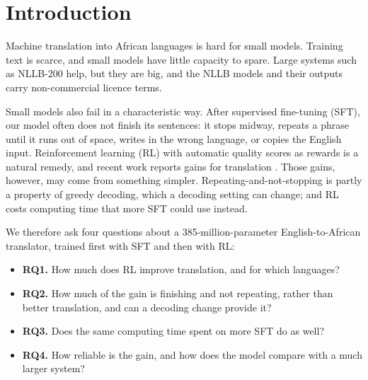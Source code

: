 \section{Introduction}\label{sec:intro}
Machine translation into African languages is hard for small models. Training text is scarce, and small models have little capacity to spare. Large systems such as NLLB-200 \citep{nllb2022nllb} help, but they are big, and the NLLB models and their outputs carry non-commercial licence terms.

Small models also fail in a characteristic way. After supervised fine-tuning (SFT), our model often does not finish its sentences: it stops midway, repeats a phrase until it runs out of space, writes in the wrong language, or copies the English input. Reinforcement learning (RL) with automatic quality scores as rewards is a natural remedy, and recent work reports gains for translation \citep{shao2024deepseekmath,feng2025mtr1zero,finkelstein2026translategemma}. Those gains, however, may come from something simpler. Repeating-and-not-stopping is partly a property of greedy decoding, which a decoding setting can change; and RL costs computing time that more SFT could use instead.

We therefore ask four questions about a 385-million-parameter English-to-African translator, trained first with SFT and then with RL:
\begin{itemize}
\item \textbf{RQ1.} How much does RL improve translation, and for which languages?
\item \textbf{RQ2.} How much of the gain is finishing and not repeating, rather than better translation, and can a decoding change provide it?
\item \textbf{RQ3.} Does the same computing time spent on more SFT do as well?
\item \textbf{RQ4.} How reliable is the gain, and how does the model compare with a much larger system?
\end{itemize}

